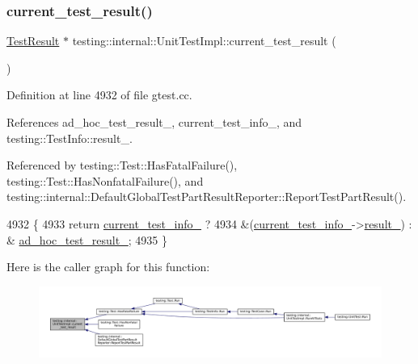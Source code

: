 \subsubsection{\texorpdfstring{current\+\_\+test\+\_\+result()}{current\_test\_result()}}
{\footnotesize\ttfamily \hyperlink{classtesting_1_1TestResult}{Test\+Result} $\ast$ testing\+::internal\+::\+Unit\+Test\+Impl\+::current\+\_\+test\+\_\+result (\begin{DoxyParamCaption}{ }\end{DoxyParamCaption})}



Definition at line 4932 of file gtest.\+cc.



References ad\+\_\+hoc\+\_\+test\+\_\+result\+\_\+, current\+\_\+test\+\_\+info\+\_\+, and testing\+::\+Test\+Info\+::result\+\_\+.



Referenced by testing\+::\+Test\+::\+Has\+Fatal\+Failure(), testing\+::\+Test\+::\+Has\+Nonfatal\+Failure(), and testing\+::internal\+::\+Default\+Global\+Test\+Part\+Result\+Reporter\+::\+Report\+Test\+Part\+Result().


\begin{DoxyCode}
4932                                               \{
4933   \textcolor{keywordflow}{return} \hyperlink{classtesting_1_1internal_1_1UnitTestImpl_a56128aac0fb5be45993715d1130b0610}{current\_test\_info\_} ?
4934       &(\hyperlink{classtesting_1_1internal_1_1UnitTestImpl_a56128aac0fb5be45993715d1130b0610}{current\_test\_info\_}->\hyperlink{classtesting_1_1TestInfo_a108fd469897a8d4e5c4361947a5ed785}{result\_}) : &
      \hyperlink{classtesting_1_1internal_1_1UnitTestImpl_a15355228a7140a08f9e2f333aa934ccd}{ad\_hoc\_test\_result\_};
4935 \}
\end{DoxyCode}
Here is the caller graph for this function\+:
\nopagebreak
\begin{figure}[H]
\begin{center}
\leavevmode
\includegraphics[width=350pt]{classtesting_1_1internal_1_1UnitTestImpl_aba3caef4ad23ce98be80250aeb0cc787_icgraph}
\end{center}
\end{figure}
\mbox{\label{classtesting_1_1internal_1_1UnitTestImpl_a61c0a51ac4e57d9f884f646ca6dd2210}} 
